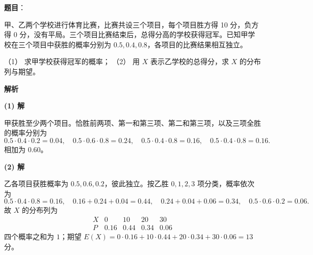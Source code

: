 \begin{answer}

\textbf{题目}：

甲、乙两个学校进行体育比赛，比赛共设三个项目，每个项目胜方得 10 分，负方得 0 分，没有平局。三个项目比赛结束后，总得分高的学校获得冠军。已知甲学校在三个项目中获胜的概率分别为 $0.5,0.4,0.8$，各项目的比赛结果相互独立。

（1） 求甲学校获得冠军的概率；  
（2） 用 $X$ 表示乙学校的总得分，求 $X$ 的分布列与期望。

\textbf{解析}

\textbf{(1) 解}

甲获胜至少两个项目。恰胜前两项、第一和第三项、第二和第三项，以及三项全胜的概率分别为
\nopagebreak[4]
\[
0.5\cdot0.4\cdot0.2=0.04,\quad
0.5\cdot0.6\cdot0.8=0.24,\quad
0.5\cdot0.4\cdot0.8=0.16,\quad
0.5\cdot0.4\cdot0.8=0.16.
\]
相加为 $0.60$。

\textbf{(2) 解}

乙各项目获胜概率为 $0.5,0.6,0.2$，彼此独立。按乙胜 $0,1,2,3$ 项分类，概率依次为
\nopagebreak[4]
\[
0.5\cdot0.4\cdot0.8=0.16,\quad
0.16+0.24+0.04=0.44,\quad
0.24+0.04+0.06=0.34,\quad
0.5\cdot0.6\cdot0.2=0.06.
\]
故 $X$ 的分布列为
\nopagebreak[4]
\[
\begin{array}{c|cccc}
X&0&10&20&30\\\hline
P&0.16&0.44&0.34&0.06
\end{array}
\]
四个概率之和为 $1$；期望 $E(X)=0\cdot0.16+10\cdot0.44+20\cdot0.34+30\cdot0.06=13$ 分。



\end{answer}
